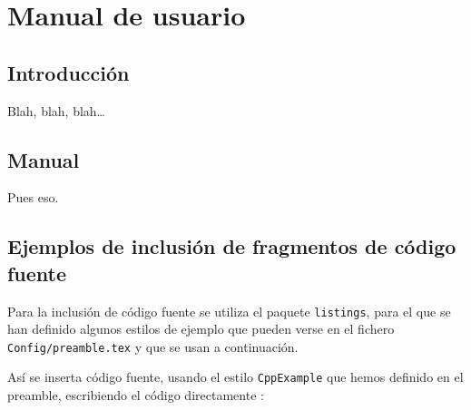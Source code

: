 %
%
%
% 
%
%
%
%


\chapter{Manual de usuario}
\label{cha:manual-de-usuario}

\section{Introducción}
\label{sec:intro-manual-de-usuario}

Blah, blah, blah\ldots


\section{Manual}
\label{sec:sec-manual-de-usuario}

Pues eso.


\section{Ejemplos de inclusión de fragmentos de código fuente}
\label{sec:codigo-fuente}

Para la inclusión de código fuente se utiliza el paquete
\texttt{listings}, para el que se han definido algunos estilos de
ejemplo que pueden verse en el fichero \texttt{Config/preamble.tex} y
que se usan a continuación.

Así se inserta código fuente, usando el estilo \texttt{CppExample} que
hemos definido en el preamble, escribiendo el código directamente :

